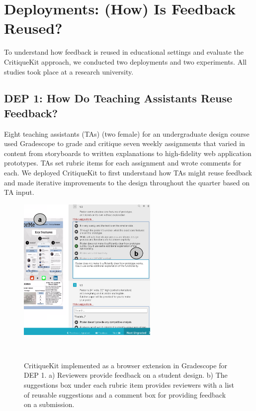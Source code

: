 \section{Deployments: (How) Is Feedback Reused?}
To understand how feedback is reused in educational settings and evaluate the CritiqueKit approach, we conducted two deployments and two experiments. All studies took place at a research university. 

\subsection{DEP 1: How Do Teaching Assistants Reuse Feedback?}
Eight teaching assistants (TAs) (two female) for an undergraduate design course used Gradescope to grade and critique seven weekly assignments that varied in content from storyboards to written explanations to high-fidelity web application prototypes. TAs set rubric items for each assignment and wrote comments for each. We deployed CritiqueKit to first understand how TAs might reuse feedback and made iterative improvements to the design throughout the quarter based on TA input.

\begin{figure}[b!]
\centering
  \includegraphics[width=0.6\textwidth]{critiquekit/figures/gradescope.png}
  \caption{CritiqueKit implemented as a browser extension in Gradescope for DEP 1. a) Reviewers provide feedback on a student design. b) The suggestions box under each rubric item provides reviewers with a list of reusable suggestions and a comment box for providing feedback on a submission.}~\label{fig:critiquekit_gradescope}
\end{figure}

